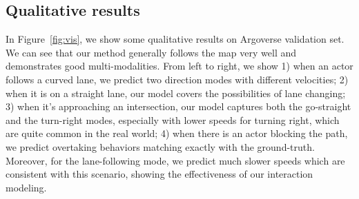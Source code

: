 \subsection{Qualitative results}
In Figure~\ref{fig:vis}, we show some qualitative results on Argoverse validation
set. We can see that our method generally follows the map very well and demonstrates good
multi-modalities. From left to right, we show 1) when an actor follows a
curved lane, we predict two direction modes with different velocities;
2) when it is on a straight lane, our model covers the possibilities of lane changing; 3)
when it's approaching an intersection, our model captures both the go-straight and the
turn-right modes, especially with lower speeds for turning right, which are
quite common in the real world; 4) when there is an actor blocking the path, we
predict overtaking behaviors matching exactly with the ground-truth. Moreover,
for the lane-following mode, we predict much slower speeds which are consistent with
this scenario, showing the effectiveness of our interaction modeling. 

